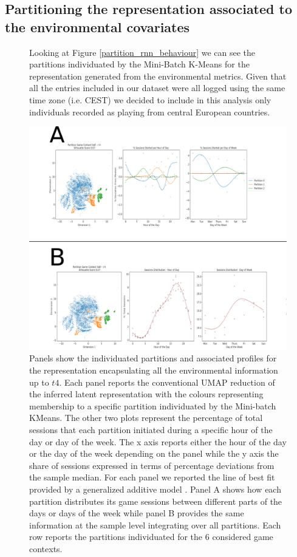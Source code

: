 \subsection{Partitioning the representation associated to the environmental covariates}
\begin{figure}[ht]
Looking at Figure \ref{partition_rnn_behaviour} we can see the partitions individuated by the Mini-Batch K-Means for the representation generated from the environmental metrics. Given that all the entries included in our dataset were all logged using the same time zone (i.e. CEST) we decided to include in this analysis only individuals recorded as playing from central European countries. 


\includegraphics[width=\textwidth]{images/chapter_4/clust_env.png}
\centering
\caption[Partitions of the representations generated by the RNN architectures from the environmental metrics]{Panels show the individuated partitions and associated profiles for the representation encapsulating all the environmental information up to $t4$. Each panel reports the conventional UMAP reduction of the inferred latent representation with the colours representing membership to a specific partition individuated by the Mini-batch KMeans. The other two plots represent the percentage of total sessions that each partition initiated during a specific hour of the day or day of the week. The x axis reports either the hour of the day or the day of the week depending on the panel while the y axis the share of sessions expressed in terms of percentage deviations from the sample median. For each panel we reported the line of best fit provided by a generalized additive model \cite{serven2018}. Panel A shows how each partition distributes its game sessions between different parts of the days or days of the week while panel B provides the same information at the sample level integrating over all partitions. Each row reports the partitions individuated for the 6 considered game contexts.}
\label{partition_rnn_env} 
\end{figure}



